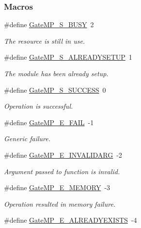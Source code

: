 \subsubsection*{Macros}
\begin{DoxyCompactItemize}
\item 
\#define \hyperlink{_gate_m_p_8h_a78c50bd892ebded475a145ae7bb71f39}{Gate\-M\-P\-\_\-\-S\-\_\-\-B\-U\-S\-Y}~2
\begin{DoxyCompactList}\small\item\em The resource is still in use. \end{DoxyCompactList}\item 
\#define \hyperlink{_gate_m_p_8h_a0f6606bbd36e2e502cbb967cee5bd086}{Gate\-M\-P\-\_\-\-S\-\_\-\-A\-L\-R\-E\-A\-D\-Y\-S\-E\-T\-U\-P}~1
\begin{DoxyCompactList}\small\item\em The module has been already setup. \end{DoxyCompactList}\item 
\#define \hyperlink{_gate_m_p_8h_a1ffb641b2f80fe24940f930986cc6dee}{Gate\-M\-P\-\_\-\-S\-\_\-\-S\-U\-C\-C\-E\-S\-S}~0
\begin{DoxyCompactList}\small\item\em Operation is successful. \end{DoxyCompactList}\item 
\#define \hyperlink{_gate_m_p_8h_ac75ff3b36b981b6088d9ec294a36a875}{Gate\-M\-P\-\_\-\-E\-\_\-\-F\-A\-I\-L}~-\/1
\begin{DoxyCompactList}\small\item\em Generic failure. \end{DoxyCompactList}\item 
\#define \hyperlink{_gate_m_p_8h_acf51ad78ae70ed3674cd379499d40fb9}{Gate\-M\-P\-\_\-\-E\-\_\-\-I\-N\-V\-A\-L\-I\-D\-A\-R\-G}~-\/2
\begin{DoxyCompactList}\small\item\em Argument passed to function is invalid. \end{DoxyCompactList}\item 
\#define \hyperlink{_gate_m_p_8h_a4565a3a4bdab37b2499fa79177297242}{Gate\-M\-P\-\_\-\-E\-\_\-\-M\-E\-M\-O\-R\-Y}~-\/3
\begin{DoxyCompactList}\small\item\em Operation resulted in memory failure. \end{DoxyCompactList}\item 
\#define \hyperlink{_gate_m_p_8h_a20d3d7bbc6c7a5ef4372384072aad0b1}{Gate\-M\-P\-\_\-\-E\-\_\-\-A\-L\-R\-E\-A\-D\-Y\-E\-X\-I\-S\-T\-S}~-\/4

\end{DoxyCompactItemize}
